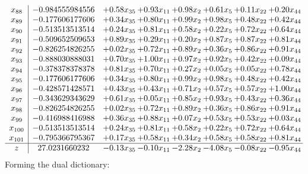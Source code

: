 \documentclass[8pt]{article}
\begin{document}
\[\begin{array}{c| c c@{\hskip 2pt} c@{\hskip 2pt} c@{\hskip 2pt} c@{\hskip 2pt} c@{\hskip 2pt} c@{\hskip 2pt} }
 x_{88}   &  -0.984555984556 & +  0.58 x_{35} & +  0.93 x_{11} & +  0.98 x_{2} & +  0.61 x_{5} & +  0.11 x_{22} & +  0.20 x_{44}\\
 x_{89}   &  -0.177606177606 & +  0.34 x_{35} & +  0.80 x_{11} & +  0.99 x_{2} & +  0.98 x_{5} & +  0.48 x_{22} & +  0.42 x_{44}\\
 x_{90}   &  -0.513513513514 & +  0.24 x_{35} & +  0.81 x_{11} & +  0.58 x_{2} & +  0.22 x_{5} & +  0.72 x_{22} & +  0.64 x_{44}\\
 x_{91}   &  -0.509652509653 & +  0.89 x_{35} & +  0.29 x_{11} & +  0.20 x_{2} & +  0.87 x_{5} & +  0.87 x_{22} & +  0.81 x_{44}\\
 x_{92}   &  -0.826254826255 & +  0.02 x_{35} & +  0.72 x_{11} & +  0.89 x_{2} & +  0.36 x_{5} & +  0.86 x_{22} & +  0.91 x_{44}\\
 x_{93}   &  -0.888030888031 & +  0.70 x_{35} & +  1.00 x_{11} & +  0.97 x_{2} & +  0.92 x_{5} & +  0.42 x_{22} & +  0.09 x_{44}\\
 x_{94}   &  -0.378378378378 & +  0.81 x_{35} & +  0.70 x_{11} & +  0.27 x_{2} & +  0.05 x_{5} & +  0.05 x_{22} & +  0.78 x_{44}\\
 x_{95}   &  -0.177606177606 & +  0.34 x_{35} & +  0.80 x_{11} & +  0.99 x_{2} & +  0.98 x_{5} & +  0.48 x_{22} & +  0.42 x_{44}\\
 x_{96}   &  -0.428571428571 & +  0.43 x_{35} & +  0.43 x_{11} & +  0.71 x_{2} & +  0.57 x_{5} & +  0.57 x_{22} & +  1.00 x_{44}\\
 x_{97}   &  -0.343629343629 & +  0.61 x_{35} & +  0.05 x_{11} & +  0.85 x_{2} & +  0.93 x_{5} & +  0.43 x_{22} & +  0.36 x_{44}\\
 x_{98}   &  -0.826254826255 & +  0.02 x_{35} & +  0.72 x_{11} & +  0.89 x_{2} & +  0.36 x_{5} & +  0.86 x_{22} & +  0.91 x_{44}\\
 x_{99}   &  -0.416988416988 & +  0.36 x_{35} & +  0.88 x_{11} & +  0.07 x_{2} & +  0.53 x_{5} & +  0.53 x_{22} & +  0.03 x_{44}\\
 x_{100}   &  -0.513513513514 & +  0.24 x_{35} & +  0.81 x_{11} & +  0.58 x_{2} & +  0.22 x_{5} & +  0.72 x_{22} & +  0.64 x_{44}\\
 x_{101}   &  -0.795366795367 & +  0.17 x_{35} & +  0.58 x_{11} & +  0.34 x_{2} & +  0.58 x_{5} & +  0.58 x_{22} & +  0.81 x_{44}\\
\hline
z    &  27.0231660232 & -0.13 x_{35} & -0.10 x_{11} & -2.28 x_{2} & -4.08 x_{5} & -0.08 x_{22} & -0.95 x_{44}\\
\end{array}\]
Forming the dual dictionary:
\end{document}
